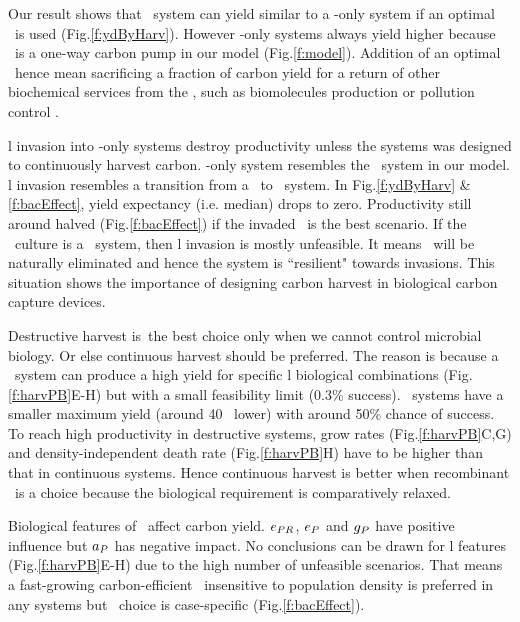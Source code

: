 \documentclass[../thesis.tex]{subfiles} %
\begin{document}
Our result shows that \PBH\ system can yield similar to a \phy-only system if an optimal \bac\ is used (Fig.\ref{f:ydByHarv}).  However \phy-only systems always yield higher because \phy\ is a one-way carbon pump in our model (Fig.\ref{f:model}).  Addition of an optimal \bac\ hence mean sacrificing a fraction of carbon yield for a return of other biochemical services from the \bac, such as biomolecules production \autocite{aytekin2016statistical} or pollution control \autocite{dash2013marine,naik2013lead}.

\Bac l invasion into \phy-only systems destroy productivity unless the systems was designed to continuously harvest carbon.  \Phy-only system resembles the \PoN\ system in our model.  \Bac l invasion resembles a transition from a \PoN\ to \PBN\ system.  In Fig.\ref{f:ydByHarv} \& \ref{f:bacEffect}, yield expectancy (i.e. median) drops to zero.  Productivity still around halved (Fig.\ref{f:bacEffect}) if the invaded \bac\ is the best scenario.  If the \phy\ culture is a \PoH\ system, then \bac l invasion is mostly unfeasible.  It means \bac\ will be naturally eliminated and hence the system is ``resilient" towards invasions.  This situation shows the importance of designing carbon harvest in biological carbon capture devices.

Destructive harvest is\ the best choice only when we cannot control microbial biology.  Or else continuous harvest should be preferred.  The reason is because a \PBH\ system can produce a high yield for specific \bac l biological combinations (Fig.\ref{f:harvPB}E-H) but with a small feasibility limit (0.3\% success).  \PBN\ systems have a smaller maximum yield (around 40 \dxdt\ lower) with around 50\% chance of success.  To reach high productivity in destructive systems, grow rates (Fig.\ref{f:harvPB}C,G) and density-independent death rate (Fig.\ref{f:harvPB}H) have to be higher than that in continuous systems.  Hence continuous harvest is better when recombinant \bac\ is a choice because the biological requirement is comparatively relaxed.

Biological features of \phy\ affect carbon yield.  $e_{PR}$, $e_P$ and $g_P$ have positive influence but $a_P$ has negative impact.  No conclusions can be drawn for \bac l features (Fig.\ref{f:harvPB}E-H) due to the high number of unfeasible scenarios.  That means a fast-growing carbon-efficient \phy\ insensitive to population density is preferred in any systems but \bac\ choice is case-specific (Fig.\ref{f:bacEffect}).
\end{document}
